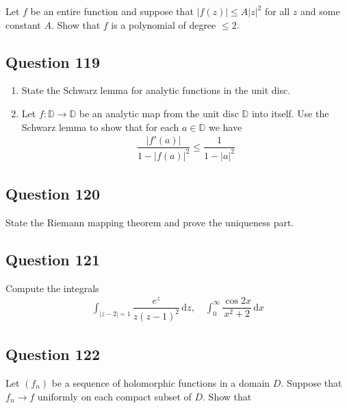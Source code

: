 \documentclass[12pt]{article}
\begin{document}
Let \(f\) be an entire function and suppose that \(|f(z)| \leq A|z|^2\)
for all \(z\) and some constant \(A\). Show that \(f\) is a polynomial
of degree \(\leq 2\).

\hypertarget{question-119-1}{%
\subsection{Question 119}\label{question-119-1}}

\begin{enumerate}
\def\labelenumi{\arabic{enumi}.}
\item
  State the Schwarz lemma for analytic functions in the unit disc.
\item
  Let \(f: \mathbb{D} \to \mathbb{D}\) be an analytic map from the unit
  disc \(\mathbb{D}\) into itself. Use the Schwarz lemma to show that
  for each \(a\in \mathbb{D}\) we have \begin{align*}
  \dfrac{|f'(a)|}{1-|f(a)|^2} \leq \dfrac{1}{1-|a|^2}
  \end{align*}
\end{enumerate}

\hypertarget{question-120-1}{%
\subsection{Question 120}\label{question-120-1}}

State the Riemann mapping theorem and prove the uniqueness part.

\hypertarget{question-121-1}{%
\subsection{Question 121}\label{question-121-1}}

Compute the integrals \begin{align*}
\int_{|z-2|=1} \dfrac{e^z}{z(z-1)^2} \,
\mathrm{d}z, \quad \int_0^\infty \dfrac{\cos 2x}{x^2 + 2} \, \mathrm{d}x
\end{align*}

\hypertarget{question-122-1}{%
\subsection{Question 122}\label{question-122-1}}

Let \((f_n)\) be a sequence of holomorphic functions in a domain \(D\).
Suppose that \(f_n \to f\) uniformly on each compact subset of \(D\).
Show that
\end{document}
